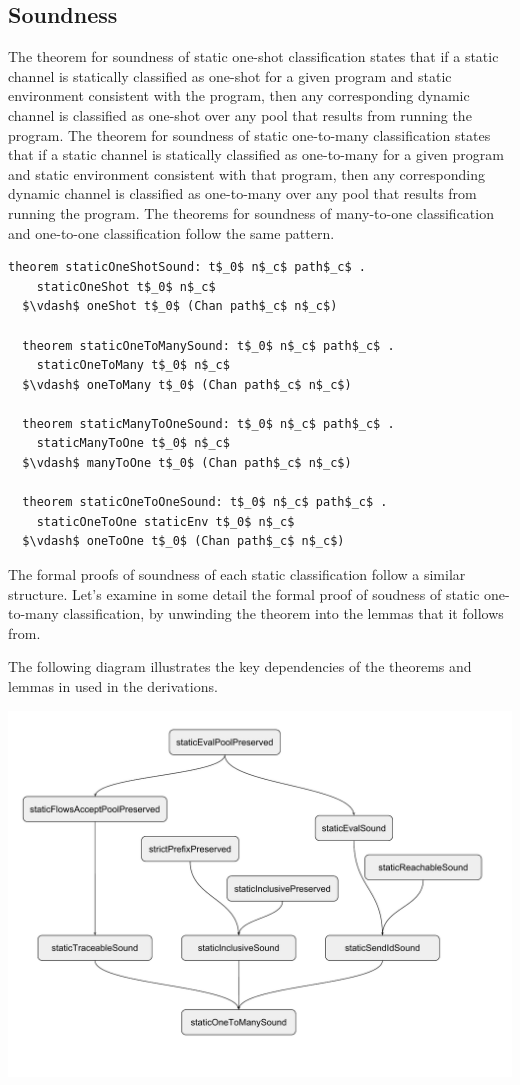 \documentclass[letterpaper, 11pt]{extarticle}
\begin{document}
\subsection{Soundness}

The theorem for soundness of static one-shot classification states that if a static channel is
statically classified as one-shot for a given program and
static environment consistent with the
program, then any corresponding dynamic channel is classified
as one-shot over any pool that results
from running the program. The theorem for soundness of
static one-to-many classification states that if
a static channel is statically classified as one-to-many for a given program and static environment
consistent with that program, then any corresponding dynamic channel is classified as one-to-many
over any pool that results from running the program.  The theorems for soundness of many-to-one
classification and one-to-one classification follow the same pattern. 

\begin{lstlisting}[language=logic, mathescape]
  theorem staticOneShotSound: t$_0$ n$_c$ path$_c$ .
    staticOneShot t$_0$ n$_c$
  $\vdash$ oneShot t$_0$ (Chan path$_c$ n$_c$)

  theorem staticOneToManySound: t$_0$ n$_c$ path$_c$ . 
    staticOneToMany t$_0$ n$_c$
  $\vdash$ oneToMany t$_0$ (Chan path$_c$ n$_c$)

  theorem staticManyToOneSound: t$_0$ n$_c$ path$_c$ . 
    staticManyToOne t$_0$ n$_c$
  $\vdash$ manyToOne t$_0$ (Chan path$_c$ n$_c$)

  theorem staticOneToOneSound: t$_0$ n$_c$ path$_c$ . 
    staticOneToOne staticEnv t$_0$ n$_c$
  $\vdash$ oneToOne t$_0$ (Chan path$_c$ n$_c$)
\end{lstlisting}

The formal proofs of soundness of each static classification follow a similar structure.
Let's examine in some detail the formal proof of soudness of static one-to-many classification,
by unwinding the theorem into the lemmas that it follows from.

The following diagram illustrates the key dependencies of the theorems and lemmas in
used in the derivations.

\includegraphics[width=1\textwidth]{cml-proof-low.pdf}
\end{document}
